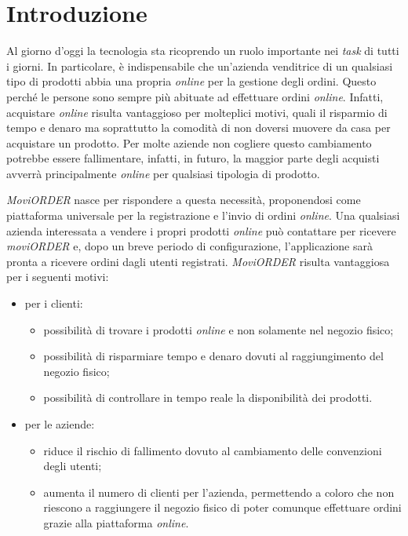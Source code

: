 
\chapter{Introduzione}
\label{cap:introduzione}

Al giorno d'oggi la tecnologia sta ricoprendo un ruolo importante nei \textit{task} di tutti i giorni. In particolare, è indispensabile che un'azienda venditrice di un qualsiasi tipo di prodotti abbia una propria  \textit{online} per la gestione degli ordini. Questo perché le persone sono sempre più abituate ad effettuare ordini \textit{online}. Infatti, acquistare \textit{online} risulta vantaggioso per molteplici motivi, quali il risparmio di tempo e denaro ma soprattutto la comodità di non doversi muovere da casa per acquistare un prodotto. Per molte aziende non cogliere questo cambiamento potrebbe essere fallimentare, infatti, in futuro, la maggior parte degli acquisti avverrà principalmente \textit{online} per qualsiasi tipologia di prodotto. 

\textit{MoviORDER} nasce per rispondere a questa necessità, proponendosi come piattaforma universale per la registrazione e l'invio di ordini \textit{online}. Una qualsiasi azienda interessata a vendere i propri prodotti \textit{online} può contattare \visione{} per ricevere \textit{moviORDER} e, dopo un breve periodo di configurazione, l'applicazione sarà pronta a ricevere ordini dagli utenti registrati. 
\textit{MoviORDER} risulta vantaggiosa per i seguenti motivi:
\begin{itemize}
	\item per i clienti:
	\begin{itemize}
		\item possibilità di trovare i prodotti \textit{online} e non solamente nel negozio fisico;
		\item possibilità di risparmiare tempo e denaro dovuti al raggiungimento del negozio fisico;
		\item possibilità di controllare in tempo reale la disponibilità dei prodotti.
	\end{itemize}
	\item per le aziende:
	\begin{itemize}
		\item riduce il rischio di fallimento dovuto al cambiamento delle convenzioni degli utenti;
		\item aumenta il numero di clienti per l'azienda, permettendo a coloro che non riescono a raggiungere il negozio fisico di poter comunque effettuare ordini grazie alla piattaforma \textit{online}.
	\end{itemize}
\end{itemize}

